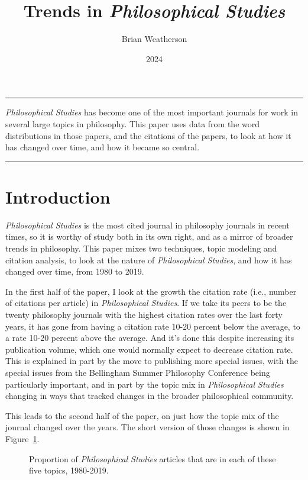 \documentclass[
  10pt,
  letterpaper,
  DIV=11,
  numbers=noendperiod,
  twoside]{scrartcl}
\title{Trends in \emph{Philosophical Studies}}
\author{Brian Weatherson}
\date{2024}
\renewenvironment{abstract}
 {\vspace{-1.25cm}
 \quotation\small\noindent\rule{\linewidth}{.5pt}\par\smallskip
 \noindent }
 {\par\noindent\rule{\linewidth}{.5pt}\endquotation}
\begin{document}
\maketitle
\begin{abstract}
\emph{Philosophical Studies} has become one of the most important
journals for work in several large topics in philosophy. This paper uses
data from the word distributions in those papers, and the citations of
the papers, to look at how it has changed over time, and how it became
so central.
\end{abstract}


\section{Introduction}\label{sec-introduction}

\emph{Philosophical Studies} is the most cited journal in philosophy
journals in recent times, so it is worthy of study both in its own
right, and as a mirror of broader trends in philosophy. This paper mixes
two techniques, topic modeling and citation analysis, to look at the
nature of \emph{Philosophical Studies}, and how it has changed over
time, from 1980 to 2019.

In the first half of the paper, I look at the growth the citation rate
(i.e., number of citations per article) in \emph{Philosophical Studies}.
If we take its peers to be the twenty philosophy journals with the
highest citation rates over the last forty years, it has gone from
having a citation rate 10-20 percent below the average, to a rate 10-20
percent above the average. And it's done this despite increasing its
publication volume, which one would normally expect to decrease citation
rate. This is explained in part by the move to publishing more special
issues, with the special issues from the Bellingham Summer Philosophy
Conference being particularly important, and in part by the topic mix in
\emph{Philosophical Studies} changing in ways that tracked changes in
the broader philosophical community.

This leads to the second half of the paper, on just how the topic mix of
the journal changed over the years. The short version of those changes
is shown in Figure~\ref{fig-five-topics}.

\begin{figure}


\caption{\label{fig-five-topics}Proportion of \emph{Philosophical
Studies} articles that are in each of these five topics, 1980-2019.}

\end{figure}%
\end{document}
